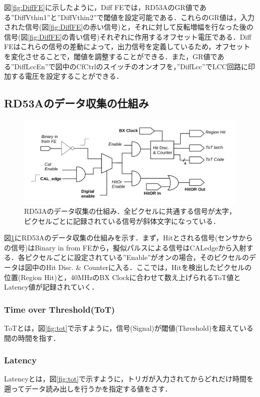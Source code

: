 図\ref{fig:DiffFE}に示したように，Diff FEでは，RD53AのGR値である''DiffVthin1''と''DiffVthin2''で閾値を設定可能である．これらのGR値は，入力された信号(図\ref{fig:DiffFE}の赤い信号)と，それに対して反転増幅を行なった後の信号(図\ref{fig:DiffFE}の青い信号)それぞれに作用するオフセット電圧である．Diff FEはこれらの信号の差動によって，出力信号を定義しているため，オフセットを変化させることで，閾値を調整することができる．また，GR値である''DiffLccEn''で図中のCfCtrlのスイッチのオンオフを，''DiffLcc''でLCC回路に印加する電圧を設定することができる．

\subsection{RD53Aのデータ収集の仕組み}

\begin{figure}[h]
  \centering
  \includegraphics[width=13cm]{./figure/RD53Aproc.png}
  \caption{RD53Aのデータ収集の仕組み．全ピクセルに共通する信号が太字，ピクセルごとに記録されている信号が斜体文字になっている．}
  \label{fig:RD53Aproc}
\end{figure}

図\ref{fig:RD53Aproc}にRD53Aのデータ収集の仕組みを示す．まず，Hitとされる信号(センサからの信号)はBinary in from FEから，擬似パルスによる信号はCALedgeから入射する．各ピクセルごとに設定されている''Enable''がオンの場合，そのピクセルのデータは図中のHit Disc. \& Counterに入る．ここでは，Hitを検出したピクセルの位置(Region Hit)と，40$\mathrm{MHz}$のBX Clockに合わせて数え上げられるToT値とLatency値が記録されていく．

\subsubsection*{Time over Threshold(ToT)}
ToTとは，図\ref{fig:tot}で示すように，信号(Signal)が閾値(Threshold)を超えている間の時間を指す．

\subsubsection*{Latency}
Latencyとは，図\ref{fig:tot}で示すように，トリガが入力されてからどれだけ時間を遡ってデータ読み出しを行うかを指定する値をさす．

